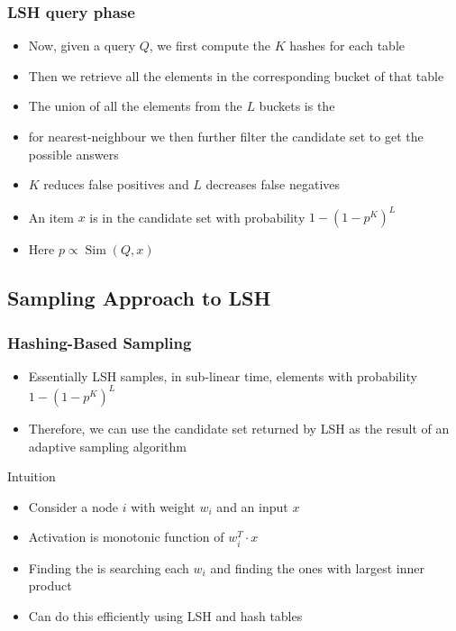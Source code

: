 \documentclass{beamer}
\begin{document}
\begin{frame}
    \frametitle{LSH query phase}
    \begin{itemize}
        \item Now, given a query $Q$, we first compute the $K$ hashes for each table 
        \item Then we retrieve all the elements in the corresponding bucket of that table
        \item The union of all the elements from the $L$ buckets is the 
        \item for nearest-neighbour we then further filter the candidate set to get the possible answers
        \item $K$ reduces false positives and $L$ decreases false 
        negatives
        \item An item $x$ is in the candidate set with probability $1-(1-p^{K})^{L}$
        \item Here $p \propto \operatorname{Sim}(Q,x)$
    \end{itemize}
    

\end{frame}

\subsection{Sampling Approach to LSH}

\begin{frame}
    \frametitle{Hashing-Based Sampling}
    \begin{itemize}
        \item Essentially LSH samples, in sub-linear time, elements with probability $1-(1-p^{K})^{L}$
        \item Therefore, we can use the candidate set returned by LSH as the result of an adaptive sampling algorithm
    \end{itemize}
    \begin{block}{Intuition}
        \begin{itemize}
            \item Consider a node $i$ with weight $w_{i}$ and an input $x$
            \item Activation is monotonic function of $w_{i}^{T}\cdot x$
            \item Finding the  is searching each $w_{i}$ and finding the ones with largest inner product
            \item Can do this efficiently using LSH and hash tables
        \end{itemize}
    \end{block}
\end{frame}
\end{document}
